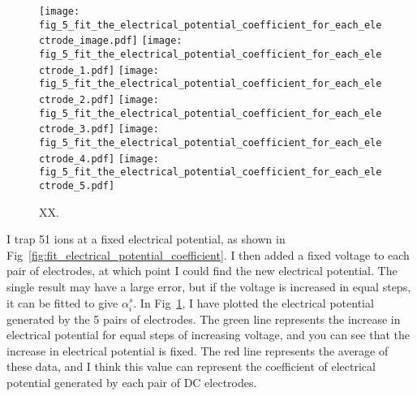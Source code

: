 \begin{figure}
    \centering

    \subcaptionbox{\label{fig:fit_the_electrical_potential_coefficient_for_each_electrode_image}}
    {\texttt{[image: fig\_5\_fit\_the\_electrical\_potential\_coefficient\_for\_each\_electrode\_image.pdf]}}
    \subcaptionbox{\label{fig:fit_the_electrical_potential_coefficient_for_each_electrode_1}}
    {\texttt{[image: fig\_5\_fit\_the\_electrical\_potential\_coefficient\_for\_each\_electrode\_1.pdf]}}
    \subcaptionbox{\label{fig:fit_the_electrical_potential_coefficient_for_each_electrode_2}}
    {\texttt{[image: fig\_5\_fit\_the\_electrical\_potential\_coefficient\_for\_each\_electrode\_2.pdf]}}
    \subcaptionbox{\label{fig:fit_the_electrical_potential_coefficient_for_each_electrode_3}}
    {\texttt{[image: fig\_5\_fit\_the\_electrical\_potential\_coefficient\_for\_each\_electrode\_3.pdf]}}
    \subcaptionbox{\label{fig:fit_the_electrical_potential_coefficient_for_each_electrode_4}}
    {\texttt{[image: fig\_5\_fit\_the\_electrical\_potential\_coefficient\_for\_each\_electrode\_4.pdf]}}
    \subcaptionbox{\label{fig:fit_the_electrical_potential_coefficient_for_each_electrode_5}}
    {\texttt{[image: fig\_5\_fit\_the\_electrical\_potential\_coefficient\_for\_each\_electrode\_5.pdf]}}

    \caption{XX.}
    \label{fig:fit_the_electrical_potential_coefficient_for_each_electrode}
\end{figure}

I trap 51 ions at a fixed electrical potential, as shown in Fig~\ref{fig:fit_electrical_potential_coefficient}. I then added a fixed voltage to each pair of electrodes, at which point I could find the new electrical potential. The single result may have a large error, but if the voltage is increased in equal steps, it can be fitted to give $\alpha_i^s$. In Fig~\ref{fig:fit_the_electrical_potential_coefficient_for_each_electrode}, I have plotted the electrical potential generated by the 5 pairs of electrodes. The green line represents the increase in electrical potential for equal steps of increasing voltage, and you can see that the increase in electrical potential is fixed. The red line represents the average of these data, and I think this value can represent the coefficient of electrical potential generated by each pair of DC electrodes.
